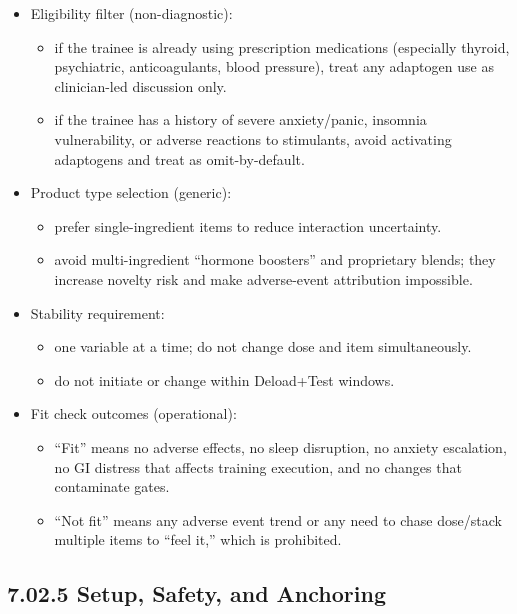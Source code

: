 \documentclass[10pt]{article}
\begin{document}
\begin{itemize}
\item Eligibility filter (non-diagnostic):
  \begin{itemize}
  \item if the trainee is already using prescription medications (especially thyroid, psychiatric, anticoagulants, blood pressure), treat any adaptogen use as clinician-led discussion only.
  \item if the trainee has a history of severe anxiety/panic, insomnia vulnerability, or adverse reactions to stimulants, avoid activating adaptogens and treat as omit-by-default.
  \end{itemize}
\item Product type selection (generic):
  \begin{itemize}
  \item prefer single-ingredient items to reduce interaction uncertainty.
  \item avoid multi-ingredient “hormone boosters” and proprietary blends; they increase novelty risk and make adverse-event attribution impossible.
  \end{itemize}
\item Stability requirement:
  \begin{itemize}
  \item one variable at a time; do not change dose and item simultaneously.
  \item do not initiate or change within Deload+Test windows.
  \end{itemize}
\item Fit check outcomes (operational):
  \begin{itemize}
  \item “Fit” means no adverse effects, no sleep disruption, no anxiety escalation, no GI distress that affects training execution, and no changes that contaminate gates.
  \item “Not fit” means any adverse event trend or any need to chase dose/stack multiple items to “feel it,” which is prohibited.
  \end{itemize}
\end{itemize}

\subsection*{7.02.5 Setup, Safety, and Anchoring}
{}
\end{document}
